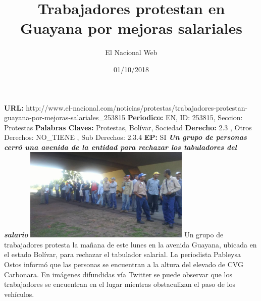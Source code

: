 \documentclass{article}%
\title{\textbf{Trabajadores protestan en Guayana por mejoras salariales}}%
\author{El Nacional Web}%
\date{01/10/2018}%
\begin{document}
%
\normalsize%
\maketitle%
\textbf{URL: }%
http://www.el{-}nacional.com/noticias/protestas/trabajadores{-}protestan{-}guayana{-}por{-}mejoras{-}salariales\_253815\newline%
%
\textbf{Periodico: }%
EN, %
ID: %
253815, %
Seccion: %
Protestas\newline%
%
\textbf{Palabras Claves: }%
Protestas, Bolívar, Sociedad\newline%
%
\textbf{Derecho: }%
2.3%
, Otros Derechos: %
NO\_TIENE%
, Sub Derechos: %
2.3.4%
\newline%
%
\textbf{EP: }%
SI\newline%
\newline%
%
\textbf{\textit{Un grupo de personas cerró una avenida de la entidad para rechazar los tabuladores del salario}}%
\newline%
\newline%
%
\includegraphics[width=300px]{181.jpg}%
\newline%
%
Un grupo de trabajadores protesta la mañana de este lunes en la avenida Guayana, ubicada en el estado Bolívar, para rechazar el tabulador salarial.%
\newline%
%
La periodista Pableysa Ostos informó que las personas se encuentran a la altura del elevado de CVG Carbonara.%
\newline%
%
En imágenes difundidas vía Twitter se puede observar que los trabajadores se encuentran en el lugar mientras obstaculizan el paso de los vehículos.%
\newline%
%
\end{document}
